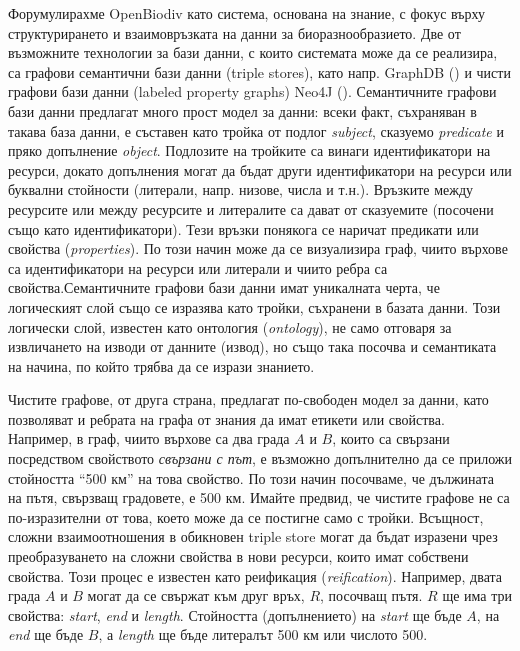 Форумулирахме OpenBiodiv като система, основана на знание, с фокус върху структурирането и взаимовръзката на данни за биоразнообразието. Две от възможните технологии за бази данни, с които системата може да се реализира, са графови семантични бази данни (triple stores), като напр. GraphDB (\cite{ontotext_graphdb_2018}) и чисти графови бази данни (labeled property graphs) Neo4J (\cite{neo4j_developers_neo4j_2012}). Семантичните графови бази данни предлагат много прост модел за данни: всеки факт, съхраняван в такава база данни, е съставен като тройка от подлог \emph{subject}, сказуемо \emph{predicate} и пряко допълнение \emph{object}. Подлозите на тройките са винаги идентификатори на ресурси, докато допълнения могат да бъдат други идентификатори на ресурси или буквални стойности (литерали,  напр. низове, числа и т.н.). Връзките между ресурсите или между ресурсите и литералите са дават от сказуемите (посочени също като идентификатори). Тези връзки понякога се наричат предикати или свойства (\emph{properties}). По този начин може да се визуализира граф, чиито върхове са идентификатори на ресурси или литерали и чиито ребра са свойства.Семантичните графови бази данни имат уникалната черта, че логическият слой също се изразява като тройки, съхранени в базата данни. Този логически слой, известен като онтология (\emph {ontology}), не само отговаря за извличането на изводи от данните (извод), но също така посочва и семантиката на начина, по който трябва да се изрази знанието.

Чистите графове, от друга страна, предлагат по-свободен модел за данни, като позволяват и ребрата на графа от знания да имат етикети или свойства. Например, в граф, чиито върхове са два града $A$ и $B$, които са свързани посредством свойството \emph {свързани с път}, е възможно допълнително да се приложи стойността ``500 км'' на това свойство. По този начин посочваме, че дължината на пътя, свързващ градовете, е 500 км. Имайте предвид, че чистите графове не са по-изразителни от това, което може да се постигне само с тройки. Всъщност, сложни взаимоотношения в обикновен triple store могат да бъдат изразени чрез преобразуването на сложни свойства в нови ресурси, които имат собствени свойства. Този процес е известен като реификация (\emph{reification}). Например, двата града $A$ и $B$ могат да се свържат към друг връх, $R$, посочващ пътя. $R$ ще има три свойства: \emph{start}, \emph{end} и \emph{length}. Стойността (допълнението) на \emph{start} ще бъде $A$, на \emph{end} ще бъде $B$, а \emph{length} ще бъде литералът 500 км или числото 500.

